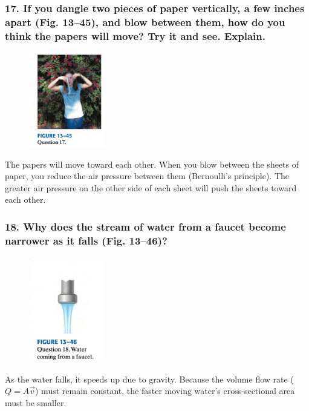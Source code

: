 \documentclass{article}
\begin{document}
\subsubsection*{
    17. If you dangle two pieces of paper vertically, a few inches apart 
    (Fig. 13–45), and blow between them, how do you think the papers will
    move? Try it and see. Explain.
}
\begin{figure}[h]
    \begin{center}
        \includegraphics[width=0.3\textwidth]{figures/17.jpg}
    \end{center}
\end{figure}
The papers will move toward each other. When you blow between the sheets of
paper, you reduce the air pressure between them (Bernoulli's principle). The
greater air pressure on the other side of each sheet will push the sheets toward
each other. 
\subsubsection*{
    18. Why does the stream of water from a faucet become narrower as it
    falls (Fig. 13–46)?
}
\begin{figure}[h]
    \begin{center}
        \includegraphics[width=0.3\textwidth]{figures/18.jpg}
    \end{center}
\end{figure}
As the water falls, it speeds up due to gravity. Because the volume flow rate
($Q = A\vec v$) must remain constant, the faster moving water's cross-sectional
area must be smaller. 
\end{document}
